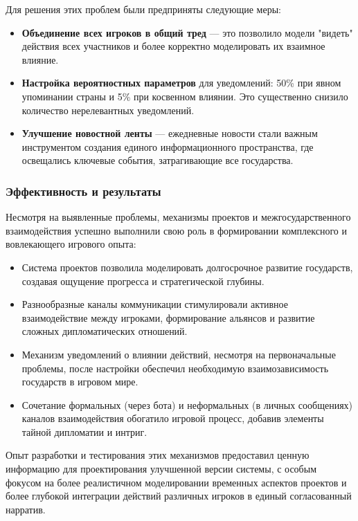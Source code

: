 Для решения этих проблем были предприняты следующие меры:

\begin{itemize}
    \item \textbf{Объединение всех игроков в общий тред} — это позволило модели "{}видеть"{} действия всех участников и более корректно моделировать их взаимное влияние.

    \item \textbf{Настройка вероятностных параметров} для уведомлений: 50\% при явном упоминании страны и 5\% при косвенном влиянии. Это существенно снизило количество нерелевантных уведомлений.

    \item \textbf{Улучшение новостной ленты} — ежедневные новости стали важным инструментом создания единого информационного пространства, где освещались ключевые события, затрагивающие все государства.
\end{itemize}

\subsubsection{Эффективность и результаты}

Несмотря на выявленные проблемы, механизмы проектов и межгосударственного взаимодействия успешно выполнили свою роль в формировании комплексного и вовлекающего игрового опыта:

\begin{itemize}
    \item Система проектов позволила моделировать долгосрочное развитие государств, создавая ощущение прогресса и стратегической глубины.

    \item Разнообразные каналы коммуникации стимулировали активное взаимодействие между игроками, формирование альянсов и развитие сложных дипломатических отношений.

    \item Механизм уведомлений о влиянии действий, несмотря на первоначальные проблемы, после настройки обеспечил необходимую взаимозависимость государств в игровом мире.

    \item Сочетание формальных (через бота) и неформальных (в личных сообщениях) каналов взаимодействия обогатило игровой процесс, добавив элементы тайной дипломатии и интриг.
\end{itemize}

Опыт разработки и тестирования этих механизмов предоставил ценную информацию для проектирования улучшенной версии системы, с особым фокусом на более реалистичном моделировании временных аспектов проектов и более глубокой интеграции действий различных игроков в единый согласованный нарратив.

